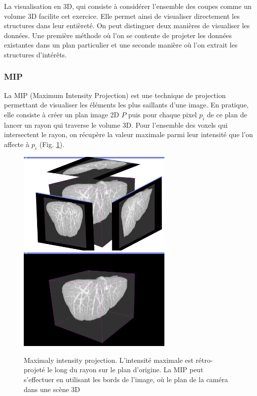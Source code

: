     La visualisation en 3D, qui consiste à considérer l'ensemble des coupes comme un volume 3D facilite cet exercice. Elle permet ainsi de visualiser directement les structures dans leur entièreté. On peut distinguer deux manières de visualiser les données. Une première méthode où l'on se contente de projeter les données existantes dans un plan particulier et une seconde manière où l'on extrait les structures d'intérêts.

      \subsubsection{MIP}
      La MIP (Maximum Intensity Projection) est une technique de projection permettant de visualiser les éléments les plus saillants d'une image. En pratique, elle consiste à créer un plan image 2D $P$ puis pour chaque pixel $p_i$ de ce plan de lancer un rayon qui traverse le volume 3D. Pour l'ensemble des voxels qui intersectent le rayon, on récupère la valeur maximale parmi leur intensité que l'on affecte à $p_i$ (Fig. \ref{fig:MIP_visualisation}). 

      \begin{figure}[h]
        \centering
        \includegraphics[height=5cm]{Images/3D_mip_montage.png}
        \includegraphics[height=5cm]{Images/3D_mip.png}
        \caption{Maximaly intensity projection. L'intensité maximale est rétro-projeté le long du rayon sur le plan d'origine. La MIP peut s'effectuer en utilisant les bords de l'image, où le plan de la caméra dans une scène 3D}
        \label{fig:MIP_visualisation}
      \end{figure}

